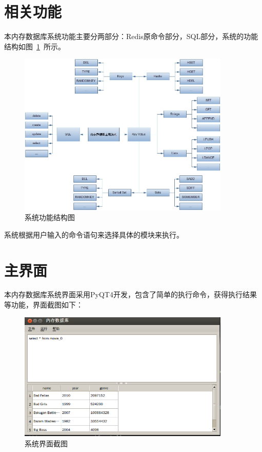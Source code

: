 \documentclass{zjutthesis}
\begin{document}
\section{相关功能}
本内存数据库系统功能主要分两部分：Redis原命令部分，SQL部分，系统的功能结构如图~\ref{fig:Command}~所示。
\begin{figure}[H]
\centering
\includegraphics[width=0.9\textwidth]{Command}
\caption{系统功能结构图}\label{fig:Command}
\vspace{\baselineskip} %
\end{figure}
系统根据用户输入的命令语句来选择具体的模块来执行。

\section{主界面}
本内存数据库系统界面采用PyQT4开发，包含了简单的执行命令，获得执行结果等功能，界面截图如下：
\begin{figure}[H]
\centering
\includegraphics[width=0.9\textwidth]{GUI}
\caption{系统界面截图}\label{fig:GUI}
\vspace{\baselineskip} %
\end{figure}
\end{document}
